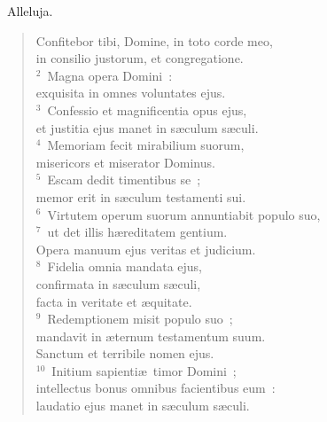 ~\lettrine[lines=10,image=true,loversize=0.05,lraise=-0.03]{A}{}lleluja. \begin{flushleft}\begin{verse}\vspace{6pt}Confitebor tibi, Domine, in toto corde meo,\\ in consilio justorum, et congregatione.\\
${}^{2}$~Magna opera Domini~:\\ exquisita in omnes voluntates ejus.\\
${}^{3}$~Confessio et magnificentia opus ejus,\\ et justitia ejus manet in s\ae culum s\ae culi.\\
${}^{4}$~Memoriam fecit mirabilium suorum,\\ misericors et miserator Dominus.\\
${}^{5}$~Escam dedit timentibus se~;\\ memor erit in s\ae culum testamenti sui.\\
${}^{6}$~Virtutem operum suorum annuntiabit populo suo,\\
${}^{7}$~ut det illis h\ae reditatem gentium.\\ Opera manuum ejus veritas et judicium.\\
${}^{8}$~Fidelia omnia mandata ejus,\\ confirmata in s\ae culum s\ae culi,\\ facta in veritate et \ae quitate.\\
${}^{9}$~Redemptionem misit populo suo~;\\ mandavit in \ae ternum testamentum suum.\\ Sanctum et terribile nomen ejus.\\
${}^{10}$~Initium sapienti\ae\ timor Domini~;\\ intellectus bonus omnibus facientibus eum~:\\ laudatio ejus manet in s\ae culum s\ae culi.\end{verse}\end{flushleft}


